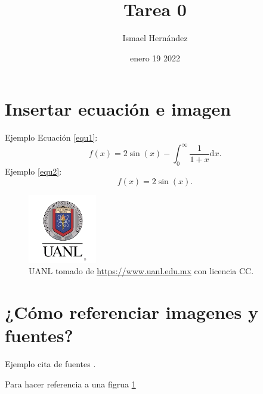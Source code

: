 \documentclass{article}
\title{Tarea 0}
\author{Ismael Hernández}
\date{enero 19 2022}
\begin{document}
\maketitle

\section{Insertar ecuación e imagen}

Ejemplo Ecuación \eqref{equ1}:
\begin{equation}
  f(x) = 2 \sin(x) - \int_0^\infty \frac{1}{1 + x} \text{d}x.
  \label{equ1}
\end{equation}
Ejemplo \eqref{equ2}:
\begin{equation}
  f(x) = 2 \sin(x).
  \label{equ2}
\end{equation}

\begin{figure}[h] %
    \centering
    \includegraphics[width=30mm]{descarga.jpg} %
    \caption{UANL tomado de \url{https://www.uanl.edu.mx} con licencia CC.}
    \label{uanl}
\end{figure}

\section{¿Cómo referenciar imagenes y fuentes?}
Ejemplo cita de fuentes \citep{ejemplo:1}.

Para hacer referencia a una figrua \ref{uanl}
\end{document}
